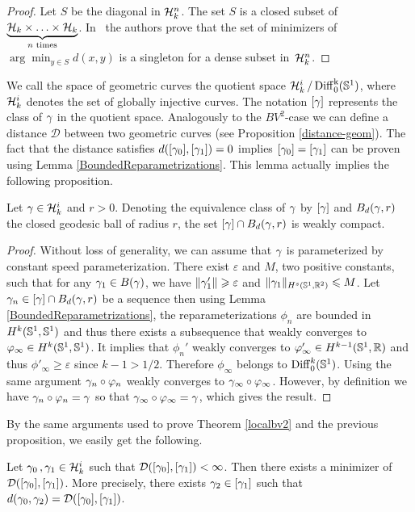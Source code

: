 \begin{proof}
Let $S$ be the diagonal in $\mathcal{H}_k^n$. The set $S$ is a closed subset of $ {\underbrace{\mathcal{H}_k \times \ldots \times \mathcal{H}_k}_{n \text{ times}}}$. In~\cite[Theorem 3.5]{Azagra} the authors prove that the set of minimizers of $\arg \min_{y\in S} d(x,y)$ is a singleton for a dense subset in~$\mathcal{H}_k^n$.
\end{proof}

We call the space of geometric curves the quotient space $\mathcal{H}_k^i \, / \, {\rm{Diff}_0^k(\mathbb{S}^1)}$, where $\mathcal{H}_k^i$ denotes the set of globally injective curves. The notation $[\gamma]$ represents the class of $\gamma$ in the quotient space.
Analogously to the $BV^2$-case we can define a distance $\mathcal{D}$ between two geometric curves (see Proposition \ref{distance-geom}). The fact that the distance satisfies $d([\gamma_0],[\gamma_1]) = 0$ implies $[\gamma_0]=[\gamma_1]$ can be proven using Lemma \ref{BoundedReparametrizations}. This lemma actually implies the following proposition.
\begin{prop}
Let $\gamma \in \mathcal{H}_k^i$ and $r>0$. Denoting the equivalence class of $\gamma$ by $[\gamma]$ and $B_d(\gamma,r)$ the closed geodesic ball of radius $r$,
 the set $[\gamma] \cap B_d(\gamma,r)$ is weakly compact. %
\end{prop}
\begin{proof}
Without loss of generality, we can assume that $\gamma$ is parameterized by constant speed parameterization. 
There exist $\varepsilon$ and $M$, two positive constants, such that for any $\gamma_1 \in B(\gamma)$, we have $\| \gamma_1' \|\geqslant \varepsilon$ and $\| \gamma_1 \|_{H^s(\mathbb{S}^1,{\mathbb R}^2)} \leqslant M$. Let $\gamma_n \in [\gamma] \cap B_d(\gamma,r)$ be a sequence then
using Lemma \ref{BoundedReparametrizations}, the reparameterizations $\phi_n$ are bounded in $H^k(\mathbb{S}^1,\mathbb{S}^1)$ and thus there exists a subsequence that weakly converges to $\varphi_\infty \in H^k(\mathbb{S}^1,\mathbb{S}^1)$. It implies that $\phi_n'$ weakly converges to $\varphi_\infty' \in H^{k-1}(\mathbb{S}^1,{\mathbb R})$ and thus $\phi'_\infty  \geq \varepsilon$ since $k-1 >1/2$. Therefore $\phi_\infty$ belongs to ${\rm{Diff}}_0^k(\mathbb{S}^1)$. Using the same argument $\gamma_n \circ \varphi_n $ weakly converges to $\gamma_\infty \circ \varphi_\infty$. However, by definition we have $\gamma_n \circ \varphi_n = \gamma$ so that $\gamma_\infty \circ \varphi_\infty = \gamma$, which gives the result.
\end{proof}

By the same arguments used to prove Theorem \ref{localbv2} and the previous proposition, we easily get the following.

\begin{thm}\label{geom-sob}
Let $\gamma_0\, ,\gamma_1 \in \mathcal{H}_k^i$ such that $\mathcal{D}([\gamma_0] , [\gamma_1])<\infty$. Then there exists a minimizer  of $\mathcal{D}([\gamma_0] , [\gamma_1])$. More precisely, there exists $\gamma_2 \in [\gamma_1]$ such that $d(\gamma_0,\gamma_2) = \mathcal{D}([\gamma_0] , [\gamma_1])$.	
\end{thm}






